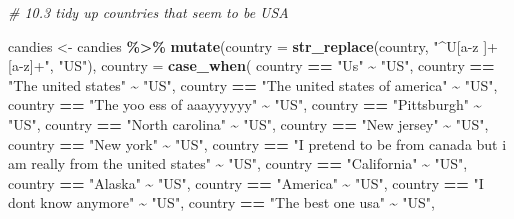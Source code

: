 \documentclass[
]{article}
\newenvironment{Shaded}{\begin{snugshade}}{\end{snugshade}}
\newcommand{\AttributeTok}[1]{\textcolor[rgb]{0.13,0.29,0.53}{#1}}
\newcommand{\CommentTok}[1]{\textcolor[rgb]{0.56,0.35,0.01}{\textit{#1}}}
\newcommand{\FunctionTok}[1]{\textcolor[rgb]{0.13,0.29,0.53}{\textbf{#1}}}
\newcommand{\NormalTok}[1]{#1}
\newcommand{\OtherTok}[1]{\textcolor[rgb]{0.56,0.35,0.01}{#1}}
\newcommand{\SpecialCharTok}[1]{\textcolor[rgb]{0.81,0.36,0.00}{\textbf{#1}}}
\newcommand{\StringTok}[1]{\textcolor[rgb]{0.31,0.60,0.02}{#1}}
\begin{document}
\begin{Shaded}
\begin{Highlighting}[]
\CommentTok{\# 10.3 tidy up countries that seem to be \textquotesingle{}USA\textquotesingle{}}

\NormalTok{candies }\OtherTok{\textless{}{-}}\NormalTok{ candies }\SpecialCharTok{\%\textgreater{}\%} 
  \FunctionTok{mutate}\NormalTok{(}\AttributeTok{country =} \FunctionTok{str\_replace}\NormalTok{(country, }\StringTok{"\^{}U[a{-}z ]+[a{-}z]+"}\NormalTok{, }\StringTok{"US"}\NormalTok{),}
         \AttributeTok{country =} \FunctionTok{case\_when}\NormalTok{(}
\NormalTok{            country }\SpecialCharTok{==} \StringTok{"Us"} \SpecialCharTok{\textasciitilde{}} \StringTok{"US"}\NormalTok{,}
\NormalTok{            country }\SpecialCharTok{==} \StringTok{"The united states"} \SpecialCharTok{\textasciitilde{}} \StringTok{"US"}\NormalTok{,}
\NormalTok{            country }\SpecialCharTok{==} \StringTok{"The united states of america"} \SpecialCharTok{\textasciitilde{}} \StringTok{"US"}\NormalTok{,}
\NormalTok{            country }\SpecialCharTok{==} \StringTok{"The yoo ess of aaayyyyyy"} \SpecialCharTok{\textasciitilde{}} \StringTok{"US"}\NormalTok{,}
\NormalTok{            country }\SpecialCharTok{==} \StringTok{"Pittsburgh"} \SpecialCharTok{\textasciitilde{}} \StringTok{"US"}\NormalTok{,}
\NormalTok{            country }\SpecialCharTok{==} \StringTok{"North carolina"} \SpecialCharTok{\textasciitilde{}} \StringTok{"US"}\NormalTok{,}
\NormalTok{            country }\SpecialCharTok{==} \StringTok{"New jersey"} \SpecialCharTok{\textasciitilde{}} \StringTok{"US"}\NormalTok{,}
\NormalTok{            country }\SpecialCharTok{==} \StringTok{"New york"} \SpecialCharTok{\textasciitilde{}} \StringTok{"US"}\NormalTok{,}
\NormalTok{            country }\SpecialCharTok{==} \StringTok{"I pretend to be from canada but i am really from the united states"}   \SpecialCharTok{\textasciitilde{}} \StringTok{"US"}\NormalTok{,}
\NormalTok{            country }\SpecialCharTok{==} \StringTok{"California"} \SpecialCharTok{\textasciitilde{}} \StringTok{"US"}\NormalTok{,}
\NormalTok{            country }\SpecialCharTok{==} \StringTok{"Alaska"}  \SpecialCharTok{\textasciitilde{}} \StringTok{"US"}\NormalTok{,}
\NormalTok{            country }\SpecialCharTok{==} \StringTok{"America"} \SpecialCharTok{\textasciitilde{}} \StringTok{"US"}\NormalTok{,}
\NormalTok{            country }\SpecialCharTok{==} \StringTok{"I don\textquotesingle{}t know anymore"} \SpecialCharTok{\textasciitilde{}} \StringTok{"US"}\NormalTok{,}
\NormalTok{            country }\SpecialCharTok{==} \StringTok{"The best one  usa"} \SpecialCharTok{\textasciitilde{}} \StringTok{"US"}\NormalTok{,}

\end{Highlighting}
\end{Shaded}
\end{document}
